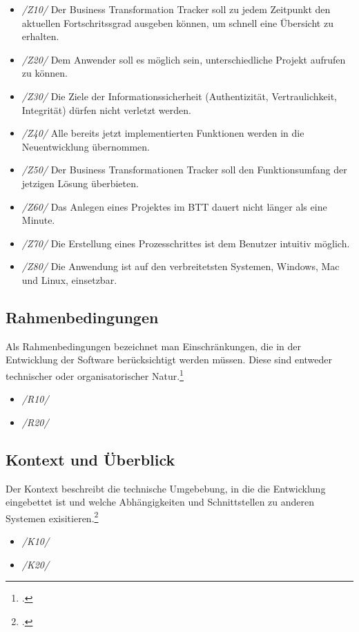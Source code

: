 \begin{itemize} 
    \item[] \emph{/Z10/} Der Business Transformation Tracker soll zu jedem Zeitpunkt den aktuellen Fortschritssgrad ausgeben können, um schnell eine Übersicht zu erhalten.
    \item[] \emph{/Z20/} Dem Anwender soll es möglich sein, unterschiedliche Projekt aufrufen zu können.
    \item[] \emph{/Z30/} Die Ziele der Informationssicherheit (Authentizität, Vertraulichkeit, Integrität) dürfen nicht verletzt werden.
    \item[] \emph{/Z40/} Alle bereits jetzt implementierten Funktionen werden in die Neuentwicklung übernommen.         
    \item[] \emph{/Z50/} Der Business Transformationen Tracker soll den Funktionsumfang der jetzigen Lösung überbieten.  
    \item[] \emph{/Z60/} Das Anlegen eines Projektes im BTT dauert nicht länger als eine Minute.
    \item[] \emph{/Z70/} Die Erstellung eines Prozesschrittes ist dem Benutzer intuitiv möglich.
    \item[] \emph{/Z80/} Die Anwendung ist auf den verbreitetsten Systemen, Windows, Mac und Linux, einsetzbar.
\end{itemize}

\subsection{Rahmenbedingungen}
Als Rahmenbedingungen bezeichnet man Einschränkungen, die in der Entwicklung der Software berücksichtigt werden müssen. Diese sind entweder technischer oder organisatorischer Natur.\footcite[Vgl.][S. 459 f.]{balzert}
\begin{itemize}
    \item[] \emph{/R10/}
    \item[] \emph{/R20/}
\end{itemize}

\subsection{Kontext und Überblick}
Der Kontext beschreibt die technische Umgebebung, in die die Entwicklung eingebettet ist und welche Abhängigkeiten und Schnittstellen zu anderen Systemen exisitieren.\footcite[Vgl.][S. 461 f.]{balzert} 
\begin{itemize}
    \item[] \emph{/K10/}
    \item[] \emph{/K20/}
\end{itemize}

